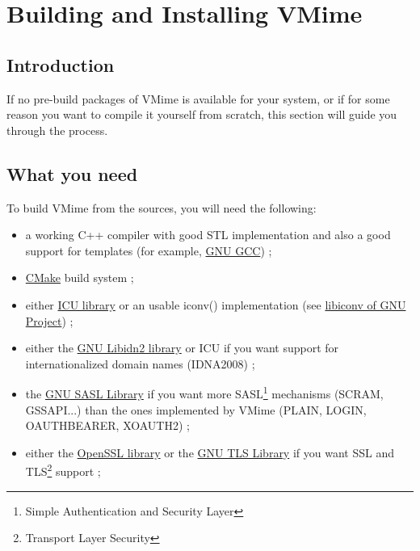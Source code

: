\label{chapter_building}
\chapter{Building and Installing VMime}

\section{Introduction}

If no pre-build packages of VMime is available for your system, or if for some
reason you want to compile it yourself from scratch, this section will guide
you through the process.

\section{What you need}

To build VMime from the sources, you will need the following:

\begin{itemize}
\item a working C++ compiler with good STL implementation and also a good
support for templates (for example, \href{http://gcc.gnu.org/}{GNU GCC}) ;
\item \href{http://www.cmake.org/}{CMake} build system ;
\item either \href{http://www.icu-project.org}{ICU library} or an usable
{\vcode iconv()} implementation (see
\href{http://www.gnu.org/software/libiconv/}{libiconv of GNU Project}) ;
\item either the \href{https://www.gnu.org/software/libidn/\#libidn2}{GNU Libidn2
library} or ICU if you want support for internationalized domain names
(IDNA2008) ;
\item the \href{http://www.gnu.org/software/gsasl/}{GNU SASL Library} if you
want more SASL\footnote{Simple Authentication and Security Layer} mechanisms
(SCRAM, GSSAPI...) than the ones implemented by VMime (PLAIN, LOGIN,
OAUTHBEARER, XOAUTH2) ;
\item either the \href{http://www.openssl.org}{OpenSSL library} or the
\href{http://www.gnu.org/software/gnutls/}{GNU TLS Library} if you
want SSL and TLS\footnote{Transport Layer Security} support ;
\end{itemize}

